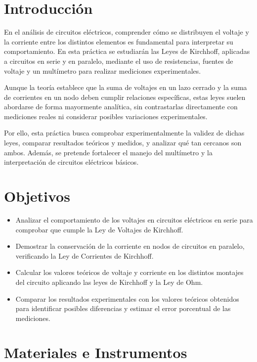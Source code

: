 \documentclass{article}
\begin{document}
    \section{Introducción}

    En el análisis de circuitos eléctricos, comprender cómo se distribuyen el voltaje y la corriente entre los distintos elementos es fundamental para interpretar su comportamiento. En esta práctica se estudiarán las Leyes de Kirchhoff, aplicadas a circuitos en serie y en paralelo, mediante el uso de resistencias, fuentes de voltaje y un multímetro para realizar mediciones experimentales. 

    Aunque la teoría establece que la suma de voltajes en un lazo cerrado y la suma de corrientes en un nodo deben cumplir relaciones específicas, estas leyes suelen abordarse de forma mayormente analítica, sin contrastarlas directamente con mediciones reales ni considerar posibles variaciones experimentales.

    Por ello, esta práctica busca comprobar experimentalmente la validez de dichas leyes, comparar resultados teóricos y medidos, y analizar qué tan cercanos son ambos. Además, se pretende fortalecer el manejo del multímetro y la interpretación de circuitos eléctricos básicos.


    \section{Objetivos}

    \begin{itemize}
        \item Analizar el comportamiento de los voltajes en circuitos eléctricos en serie para comprobar que cumple la Ley de Voltajes de Kirchhoff.
        \item Demostrar la conservación de la corriente en nodos de circuitos en paralelo, verificando la Ley de Corrientes de Kirchhoff.
        \item Calcular los valores teóricos de voltaje y corriente en los distintos montajes del circuito aplicando las leyes de Kirchhoff y la Ley de Ohm.
        \item Comparar los resultados experimentales con los valores teóricos obtenidos para identificar posibles diferencias y estimar el error porcentual de las mediciones.
    \end{itemize}

    \section{Materiales e Instrumentos}
\end{document}
